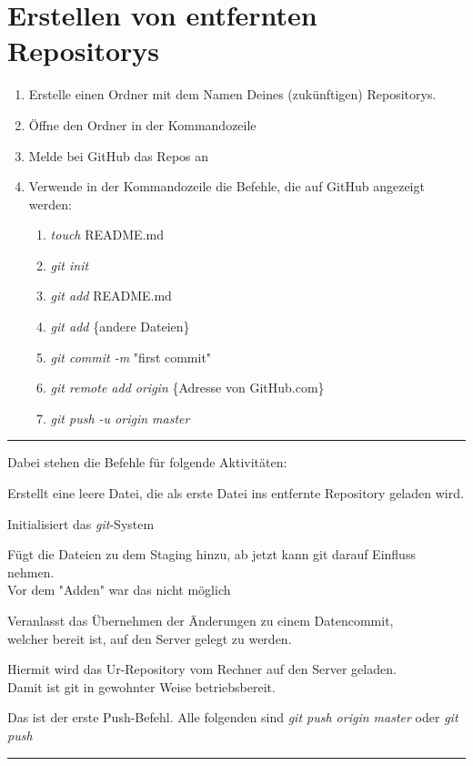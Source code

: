 \section{Erstellen von entfernten Repositorys}				%
\begin{enumerate}
	\item{Erstelle einen Ordner mit dem Namen Deines (zukünftigen) Repositorys.}
	\item{Öffne den Ordner in der Kommandozeile}
	\item{Melde bei GitHub das Repos an}
	\item{Verwende in der Kommandozeile die Befehle, die auf GitHub angezeigt werden:}
	\begin{enumerate}
		\item{\emph{touch} README.md}
		\item{\emph{git init}}
		\item{\emph{git add} README.md}
		\item{\emph{git add} \{andere Dateien\}}
		\item{\emph{git commit -m} "first commit"}
		\item{\emph{git remote add origin} \{Adresse von GitHub.com\}}
		\item{\emph{git push -u origin master}}
	\end{enumerate}
\end{enumerate}
\hrule 
\vspace{3pt}
Dabei stehen die Befehle  für folgende Aktivitäten:
\begin{description}[leftmargin=\parindent,labelsep=8pt]
	\item[a] Erstellt eine leere Datei, die als erste Datei ins entfernte Repository geladen wird.
	\item[b] Initialisiert das \emph{git}-System
	\item[c] Fügt die Dateien zu dem Staging hinzu, ab jetzt kann git darauf Einfluss nehmen. \\ \phantom{} Vor dem "Adden" war das nicht möglich
	\item[d] Veranlasst das Übernehmen der Änderungen zu einem Datencommit,\\ \phantom{} welcher bereit ist, auf den Server gelegt zu werden.
	\item[e]  Hiermit wird das Ur-Repository vom Rechner auf den Server geladen.\\ \phantom{} Damit ist git in gewohnter Weise betriebsbereit.
	\item[f] Das ist der erste Push-Befehl. Alle folgenden sind \emph{git push origin master} oder \emph{git push}
\end{description}
\hrule 
\vspace{3pt}
